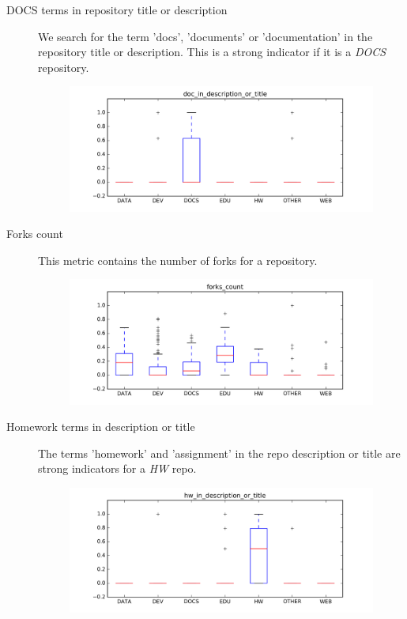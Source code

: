 \documentclass[a4paper]{scrartcl}
\begin{document}

		\begin{description}
			\item[DOCS terms in repository title or description]
				We search for the term 'docs', 'documents' or 'documentation' in the repository title or description. This is a strong indicator if it is a \emph{DOCS} repository.
				\begin{figure}[h!]
					\centering
					\includegraphics[width=0.75\linewidth]{figures/doc_in_description_or_title.png}
				\end{figure}
			\item[Forks count]
				This metric contains the number of forks for a repository.
				\begin{figure}[h!]
					\centering
					\includegraphics[width=0.75\linewidth]{figures/forks_count.png}
				\end{figure}
			\item[Homework terms in description or title]
				The terms 'homework' and 'assignment' in the repo description or title are strong indicators for a \emph{HW} repo.
				\begin{figure}[h!]
					\centering
					\includegraphics[width=0.75\linewidth]{figures/hw_in_description_or_title.png}

\end{figure}
\end{description}
\end{document}
